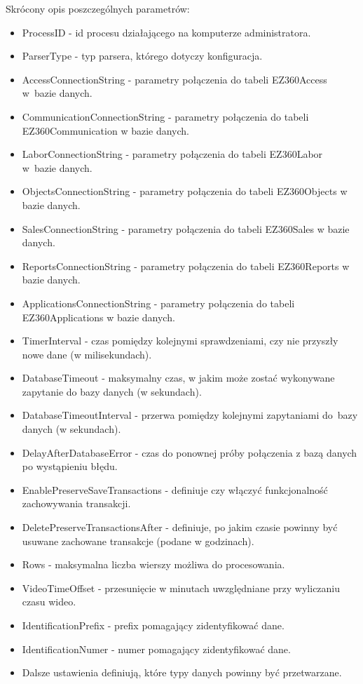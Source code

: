 \documentclass[a4paper]{book}
\begin{document}
Skrócony opis poszczególnych parametrów:
\begin{itemize}
	\setlength\itemsep{0.1pt}
	\item ProcessID - id procesu działającego na komputerze administratora.
	\item ParserType - typ parsera, którego dotyczy konfiguracja.
	\item AccessConnectionString - parametry połączenia do tabeli EZ360Access w~bazie danych.
	\item CommunicationConnectionString - parametry połączenia do tabeli EZ360Communication w bazie danych.
	\item LaborConnectionString - parametry połączenia do tabeli EZ360Labor w~bazie danych.
	\item ObjectsConnectionString - parametry połączenia do tabeli EZ360Objects w bazie danych.
	\item SalesConnectionString - parametry połączenia do tabeli EZ360Sales w bazie danych.
	\item ReportsConnectionString - parametry połączenia do tabeli EZ360Reports w bazie danych.
	\item ApplicationsConnectionString - parametry połączenia do tabeli EZ360Applications w bazie danych.
	\item TimerInterval - czas pomiędzy kolejnymi sprawdzeniami, czy nie przyszły nowe dane (w milisekundach).
	\item DatabaseTimeout - maksymalny czas, w jakim może zostać wykonywane zapytanie do bazy danych (w sekundach).
	\item DatabaseTimeoutInterval - przerwa pomiędzy kolejnymi zapytaniami do~bazy danych (w sekundach).
	\item DelayAfterDatabaseError - czas do ponownej próby połączenia z bazą danych po wystąpieniu błędu.
	\item EnablePreserveSaveTransactions - definiuje czy włączyć funkcjonalność zachowywania transakcji.
	\item DeletePreserveTransactionsAfter - definiuje, po jakim czasie powinny być usuwane zachowane transakcje (podane w godzinach).
	\item Rows - maksymalna liczba wierszy możliwa do procesowania.
	\item VideoTimeOffset - przesunięcie w minutach uwzględniane przy wyliczaniu czasu wideo.
	\item IdentificationPrefix - prefix pomagający zidentyfikować dane.
	\item IdentificationNumer - numer pomagający zidentyfikować dane.
	\item Dalsze ustawienia definiują, które typy danych powinny być przetwarzane.
\end{itemize}
\end{document}
